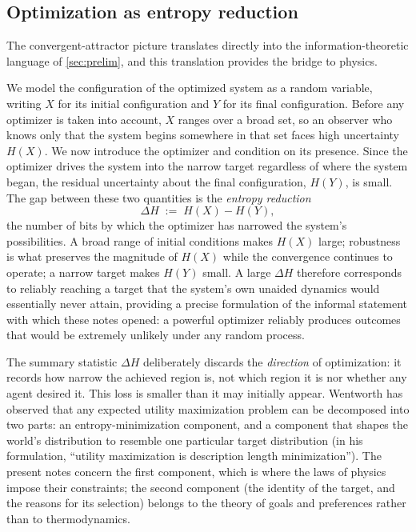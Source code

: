 \documentclass[11pt]{article}
\begin{document}
\subsection{Optimization as entropy reduction}
\label{sec:optentropy}

The convergent-attractor picture translates directly into the information-theoretic language of \cref{sec:prelim}, and this translation provides the bridge to physics.

We model the configuration of the optimized system as a random variable, writing $X$ for its initial configuration and $Y$ for its final configuration. Before any optimizer is taken into account, $X$ ranges over a broad set, so an observer who knows only that the system begins somewhere in that set faces high uncertainty $H(X)$. We now introduce the optimizer and condition on its presence. Since the optimizer drives the system into the narrow target regardless of where the system began, the residual uncertainty about the final configuration, $H(Y)$, is small. The gap between these two quantities is the \emph{entropy reduction}
\[
\Delta H \;:=\; H(X) - H(Y),
\]
the number of bits by which the optimizer has narrowed the system's possibilities. A broad range of initial conditions makes $H(X)$ large; robustness is what preserves the magnitude of $H(X)$ while the convergence continues to operate; a narrow target makes $H(Y)$ small. A large $\Delta H$ therefore corresponds to reliably reaching a target that the system's own unaided dynamics would essentially never attain, providing a precise formulation of the informal statement with which these notes opened: a powerful optimizer reliably produces outcomes that would be extremely unlikely under any random process.

\begin{remark}
\label{rem:translation}
The summary statistic $\Delta H$ deliberately discards the \emph{direction} of optimization: it records how narrow the achieved region is, not which region it is nor whether any agent desired it. This loss is smaller than it may initially appear. Wentworth has observed that any expected utility maximization problem can be decomposed into two parts: an entropy-minimization component, and a component that shapes the world's distribution to resemble one particular target distribution (in his formulation, ``utility maximization is description length minimization''). The present notes concern the first component, which is where the laws of physics impose their constraints; the second component (the identity of the target, and the reasons for its selection) belongs to the theory of goals and preferences rather than to thermodynamics.
\end{remark}
\end{document}

